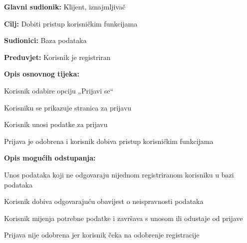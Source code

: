 						\noindent {}
						\begin{packed_item}
							
							\item \textbf{Glavni sudionik: } Klijent, iznajmljivač
							\item  \textbf{Cilj:} Dobiti pristup korisničkim funkcijama
							\item  \textbf{Sudionici:} Baza podataka
							\item  \textbf{Preduvjet:} Korisnik je registriran
							\item  \textbf{Opis osnovnog tijeka:}
							
							\item[] \begin{packed_enum}
								
								\item Korisnik odabire opciju „Prijavi se“ 
								\item Korisniku se prikazuje stranica za prijavu  
								\item Korisnik unosi podatke za prijavu 
								\item Prijava je odobrena i korisnik dobiva pristup korisničkim funkcijama 
								 
								
							\end{packed_enum}
							
							\item  \textbf{Opis mogućih odstupanja:}
							
							\item[] \begin{packed_item}
								
								\item[3.a] Unos podataka koji ne odgovaraju nijednom registriranom korisniku u bazi podataka  
								\item[] \begin{packed_enum}
									
									\item Korisnik dobiva odgovarajuću obavijest o neispravnosti podataka 
									\item Korisnik mijenja potrebne podatke i završava s unosom ili odustaje od prijave 
									
								\end{packed_enum}
								\item[4.a] Prijava nije odobrena jer korisnik čeka na odobrenje registracije    
								\item[] \begin{packed_enum}
									

\end{packed_enum}
\end{packed_item}
\end{packed_item}
